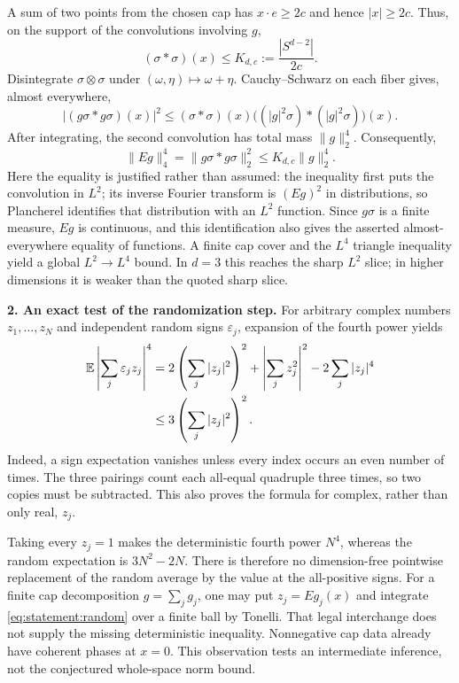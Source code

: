 \documentclass[11pt,a4paper]{article}
\numberwithin{equation}{section}
\begin{document}
A sum of two points from the chosen cap has $x\cdot e\ge2c$ and hence
$|x|\ge2c$. Thus, on the support of the convolutions involving $g$,
\[
 (\sigma*\sigma)(x)\le K_{d,c}:=\frac{|S^{d-2}|}{2c}.
\]
Disintegrate $\sigma\otimes\sigma$ under $(\omega,\eta)\mapsto\omega+\eta$.
Cauchy--Schwarz on each fiber gives, almost everywhere,
\[
 |(g\sigma*g\sigma)(x)|^2
 \le (\sigma*\sigma)(x)
       \bigl((|g|^2\sigma)*(|g|^2\sigma)\bigr)(x).
\]
After integrating, the second convolution has total mass $\|g\|_2^4$.
Consequently,
\begin{equation}\label{eq:statement:cap-four}
 \|Eg\|_4^4=\|g\sigma*g\sigma\|_2^2
       \le K_{d,c}\|g\|_2^4.
\end{equation}
Here the equality is justified rather than assumed: the inequality first
puts the convolution in $L^2$; its inverse Fourier transform is $(Eg)^2$
in distributions, so Plancherel identifies that distribution with an $L^2$
function. Since $g\sigma$ is a finite measure, $Eg$ is continuous, and this
identification also gives the asserted almost-everywhere equality of
functions. A finite cap cover and the $L^4$ triangle inequality yield a
global $L^2\to L^4$ bound. In $d=3$ this reaches the sharp $L^2$ slice;
in higher dimensions it is weaker than the quoted sharp slice.

\textbf{2. An exact test of the randomization step.}
For arbitrary complex numbers $z_1,\ldots,z_N$ and independent random signs
$\varepsilon_j$, expansion of the fourth power yields
\begin{align}
 \mathbb E\left|\sum_j\varepsilon_jz_j\right|^4
 &=2\left(\sum_j|z_j|^2\right)^2+
       \left|\sum_jz_j^2\right|^2-2\sum_j|z_j|^4\notag\\
 &\le3\left(\sum_j|z_j|^2\right)^2.
 \label{eq:statement:random}
\end{align}
Indeed, a sign expectation vanishes unless every index occurs an even
number of times. The three pairings count each all-equal quadruple three
times, so two copies must be subtracted. This also proves the formula for
complex, rather than only real, $z_j$.

Taking every $z_j=1$ makes the deterministic fourth power $N^4$, whereas
the random expectation is $3N^2-2N$. There is therefore no dimension-free
pointwise replacement of the random average by the value at the all-positive
signs. For a finite cap decomposition $g=\sum_jg_j$, one may put
$z_j=Eg_j(x)$ and integrate \eqref{eq:statement:random} over a finite ball by
Tonelli. That legal interchange does not supply the missing deterministic
inequality. Nonnegative cap data already have coherent phases at $x=0$.
This observation tests an intermediate inference, not the conjectured
whole-space norm bound.
\end{document}
